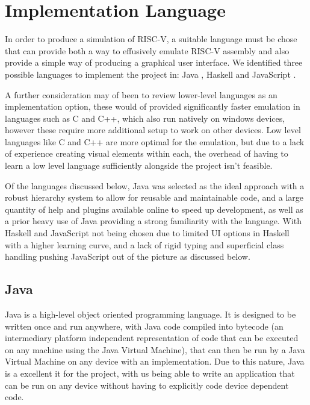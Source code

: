 \section{Implementation Language}
In order to produce a simulation of RISC-V, a suitable language must be chose that can provide both a way to effusively emulate RISC-V assembly and also provide a simple way of producing a graphical user interface. We identified three possible languages to implement the project in: Java \cite{sunmicrosystems_2022_java}, Haskell \cite{marlow_2010_haskell} and JavaScript \cite{ecmainternational_2023_ecmascript}.

A further consideration may of been to review lower-level languages as an implementation option, these would of provided significantly faster emulation in languages such as C and C++, which also run natively on windows devices, however these require more additional setup to work on other devices. Low level languages like C and C++ are more optimal for the emulation, but due to a lack of experience creating visual elements within each, the overhead of having to learn a low level language sufficiently alongside the project isn't feasible.

Of the languages discussed below, Java was selected as the ideal approach with a robust hierarchy system to allow for reusable and maintainable code, and a large quantity of help and plugins available online to speed up development, as well as a prior heavy use of Java providing a strong familiarity with the language. With Haskell and JavaScript not being chosen due to limited \ac{UI} options in Haskell with a higher learning curve, and a lack of rigid typing and superficial class handling pushing JavaScript out of the picture as discussed below.

\subsection{Java}
Java \cite{sunmicrosystems_2022_java} is a high-level object oriented programming language. It is designed to be written once and run anywhere, with Java code compiled into bytecode (an intermediary platform independent representation of code that can be executed on any machine using the Java Virtual Machine), that can then be run by a Java Virtual Machine on any device with an implementation. Due to this nature, Java is a excellent it for the project, with us being able to write an application that can be run on any device without having to explicitly code device dependent code.

